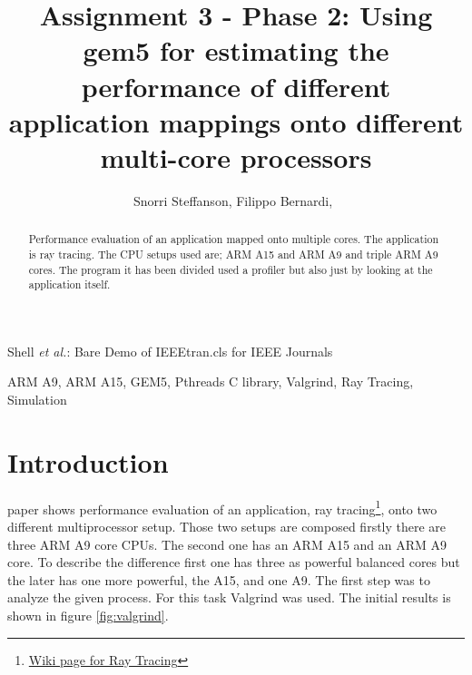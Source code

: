 \documentclass[journal]{IEEEtran}
\begin{document}
\title{Assignment 3 - Phase 2: Using gem5 for estimating the performance of different application mappings onto different multi-core processors
}

\author{Snorri Steffanson, Filippo Bernardi,~
}



%
{Shell \MakeLowercase{\textit{et al.}}: Bare Demo of IEEEtran.cls for IEEE Journals}


\maketitle

\begin{abstract}
Performance evaluation of an application mapped onto multiple cores. The application is ray tracing. The CPU setups used are; ARM A15 and ARM A9 and triple ARM A9 cores. The program it has been divided used a profiler but also just by looking at the application itself. 
\end{abstract}

\begin{IEEEkeywords}
ARM A9, ARM A15, GEM5, Pthreads C library, Valgrind, Ray Tracing, Simulation
\end{IEEEkeywords}


\IEEEpeerreviewmaketitle

\section{Introduction}

 paper shows performance evaluation of an application, ray tracing\footnote{\hyperref{https://en.wikipedia.org/wiki/Ray_tracing_(graphics)}{}{Ray Tracing}{Wiki page for Ray Tracing}}, onto two different multiprocessor setup. Those two setups are composed firstly there are three ARM A9 core CPUs. The second one has an ARM A15 and an ARM A9 core.
To describe the difference first one has three as powerful balanced cores but the later has one more powerful, the A15, and one A9.
The first step was to analyze the given process. For this task Valgrind was used.
The initial results is shown in figure \ref{fig:valgrind}.
\end{document}
